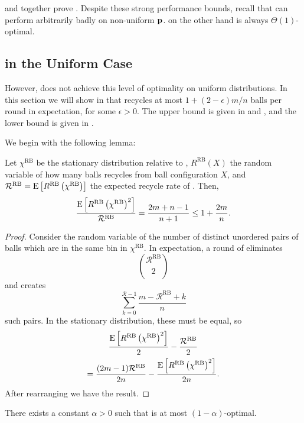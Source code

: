  and 
together prove . Despite these strong
performance bounds, recall that \FB can perform arbitrarily badly on
non-uniform $\mathbf{p}$. \RB on the other hand is always $\Theta(1)$-optimal.

\subsection{\RB in the Uniform Case}

However, \RB{} does not achieve this level of optimality on uniform
distributions. In this section we will show in  that \RB
recycles at most $1+(2-\epsilon)m/n$ balls per round in expectation, for some
$\epsilon > 0$.  The upper bound is given in  and
, and the lower bound is given in
.

We begin with the following lemma:

\begin{lemma}\label{lem:pair-flow}
	Let $\chi^\textrm{RB}$ be the stationary distribution relative to \RB,
	$R^\textrm{RB}(X)$ the random variable of how many balls \RB recycles from
	ball configuration $X$, and $\mathcal{R}^\textrm{RB} =
	\mathrm{E}\left[R^\textrm{RB}\left(\chi^\textrm{RB}\right)\right]$ the expected recycle rate
	of \RB. Then,
	\[ \frac{\mathrm{E}\left[R^\textrm{RB}\left(\chi^\textrm{RB}\right)^2\right]}{\mathcal{R}^\textrm{RB}} = \frac{2m+n-1}{n+1} \leq 1 + \frac{2m}{n}. \]
\end{lemma}

\begin{proof}
	Consider the random variable of the number of distinct unordered pairs of
	balls which are in the same bin in $\chi^\textrm{RB}$. In expectation, a
	round of \RB eliminates 
	\[\binom{\mathcal{R}^\textrm{RB}}{2}\]
	and creates
	\[\sum_{k=0}^{\mathcal{R} - 1} \frac{m - \mathcal{R}^\textrm{RB} + k}{n}\]
	such pairs. In the stationary distribution, these must be equal, so
	\begin{multline*}
		\frac{\mathrm{E}\left[R^\textrm{RB}\left(\chi^\textrm{RB}\right)^2\right]}{2} - \frac{\mathcal{R}^\textrm{RB}}{2} \\
		= \frac{(2m-1)\mathcal{R}^\textrm{RB}}{2n} - \frac{\mathrm{E}\left[R^\textrm{RB}\left(\chi^\textrm{RB}\right)^2\right]}{2n}.
	\end{multline*}
	After rearranging we have the result.
\end{proof}

\begin{lemma}\label{lem:rbuni-upper}
	There exists a constant $\alpha > 0$ such that \RB is at most
	$(1-\alpha)$-optimal.
\end{lemma}

